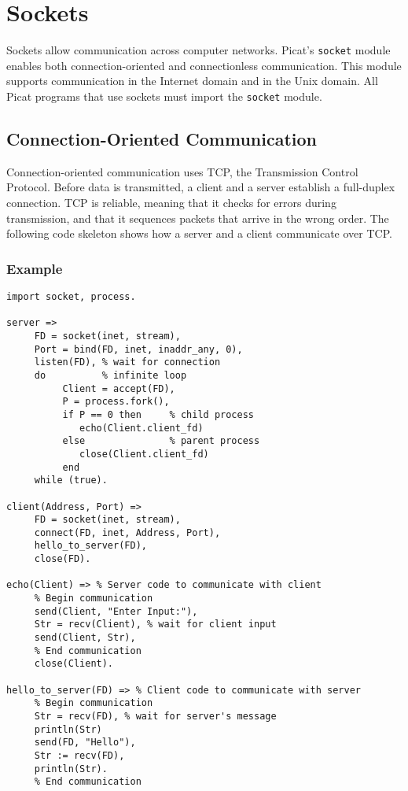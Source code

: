\chapter{Sockets}
Sockets allow communication across computer networks.  Picat's \texttt{socket} module enables both connection-oriented and connectionless communication.  This module supports communication in the Internet domain and in the Unix domain.  All Picat programs that use sockets must import the \texttt{socket} module.

\section{\label{tcp}Connection-Oriented Communication}

Connection-oriented communication uses TCP, the Transmission Control Protocol.  Before data is transmitted, a client and a server establish a full-duplex connection.  TCP is reliable, meaning that it checks for errors during transmission, and that it sequences packets that arrive in the wrong order.  The following code skeleton shows how a server and a client communicate over TCP.

\subsection*{Example}
\begin{verbatim}
import socket, process.

server =>
     FD = socket(inet, stream),
     Port = bind(FD, inet, inaddr_any, 0),
     listen(FD), % wait for connection
     do          % infinite loop
          Client = accept(FD),
          P = process.fork(),
          if P == 0 then     % child process
             echo(Client.client_fd)
          else               % parent process
             close(Client.client_fd)
          end
     while (true).

client(Address, Port) =>
     FD = socket(inet, stream),
     connect(FD, inet, Address, Port),
     hello_to_server(FD),
     close(FD). 

echo(Client) => % Server code to communicate with client
     % Begin communication
     send(Client, "Enter Input:"),
     Str = recv(Client), % wait for client input
     send(Client, Str),
     % End communication
     close(Client).

hello_to_server(FD) => % Client code to communicate with server
     % Begin communication
     Str = recv(FD), % wait for server's message
     println(Str)
     send(FD, "Hello"),
     Str := recv(FD),
     println(Str).
     % End communication
\end{verbatim}


